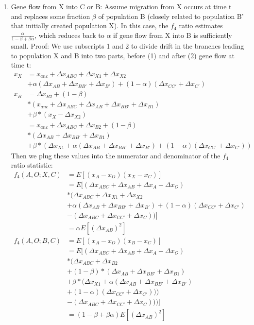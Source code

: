 \documentclass[12pt]{report}
\begin{document}
\begin{enumerate}
	\item Gene flow from X into C or B:
	Assume migration from X occurs at time t and replaces some fraction $\beta$ of population B (closely related to population B' that initially created population X). In this case, the $f_4$ ratio estimates $\frac{\alpha}{1 - \beta + \beta\alpha}$, which reduces back to $\alpha$ if gene flow from X into B is sufficiently small. Proof:
	We use subscripts 1 and 2 to divide drift in the branches leading to population X and B into two parts, before (1) and after (2) gene flow at time t:
	\begin{align*}
	x_X &= x_{anc} + \Delta{x_{ABC}} + \Delta{x_{X1}} + \Delta{x_{X2}} \\
	&+ \alpha(\Delta{x_{AB}} + \Delta{x_{BB'}} + \Delta{x_{B'}}) + (1 - \alpha)(\Delta{x_{CC'}} + \Delta{x_{C'}})\\
	x_B &= \Delta{x_{B2}} + (1 - \beta)\\
	&*(x_{anc} + \Delta{x_{ABC}} + \Delta{x_{AB}} + \Delta{x_{BB'}} + \Delta{x_{B1}}) \\
	&+ \beta*(x_X - \Delta{x_{X2}})\\
	&= x_{anc} + \Delta{x_{ABC}} + \Delta{x_{B2}} + (1 - \beta)\\
	&*(\Delta{x_{AB}} + \Delta{x_{BB'}} + \Delta{x_{B1}}) \\
	&+ \beta*(\Delta{x_{X1}} + \alpha(\Delta{x_{AB}} + \Delta{x_{BB'}} + \Delta{x_{B'}}) + (1 - \alpha)(\Delta{x_{CC'}} + \Delta{x_{C'}}))	
	\end{align*}
	Then we plug these values into the numerator and denominator of the $f_4$ ratio statistic:
	\begin{align*}
	f_4(A,O;X,C) &= E[(x_A - x_O)(x_X - x_C)] \\
	&= E[(\Delta{x_{ABC}} + \Delta{x_{AB}} + \Delta{x_{A}} - \Delta{x_{O}})\\
	&*(\Delta{x_{ABC}} + \Delta{x_{X1}} + \Delta{x_{X2}} \\
	&+ \alpha(\Delta{x_{AB}} + \Delta{x_{BB'}} + \Delta{x_{B'}}) + (1 - \alpha)(\Delta{x_{CC'}} + \Delta{x_{C'}}) \\
	&- (\Delta{x_{ABC}} + \Delta{x_{CC'}} + \Delta{x_{C}}))]\\
	&=\alpha E[(\Delta{x_{AB}})^2]\\
	f_4(A,O;B,C) &= E[(x_A - x_O)(x_B - x_C)] \\
	&= E[(\Delta{x_{ABC}} + \Delta{x_{AB}} + \Delta{x_{A}} - \Delta{x_{O}})\\
	&*(\Delta{x_{ABC}} + \Delta{x_{B2}} \\
	&+(1 - \beta)*(\Delta{x_{AB}} + \Delta{x_{BB'}} + \Delta{x_{B1}}) \\
	&+ \beta*(\Delta{x_{X1}} + \alpha(\Delta{x_{AB}} + \Delta{x_{BB'}} + \Delta{x_{B'}}) \\
	&+ (1 - \alpha)(\Delta{x_{CC'}} + \Delta{x_{C'}}))) \\
	&- (\Delta{x_{ABC}} + \Delta{x_{CC'}} + \Delta{x_{C}})))]\\
	&=(1 - \beta + \beta\alpha)E[(\Delta{x_{AB}})^2]
	\end{align*}
	

\end{enumerate}
\end{document}

